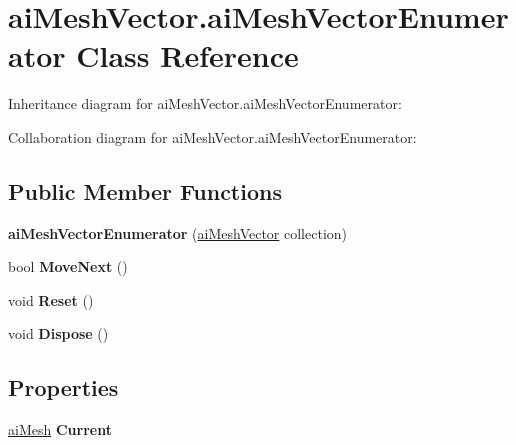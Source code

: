 \hypertarget{classai_mesh_vector_1_1ai_mesh_vector_enumerator}{\section{ai\+Mesh\+Vector.\+ai\+Mesh\+Vector\+Enumerator Class Reference}
\label{classai_mesh_vector_1_1ai_mesh_vector_enumerator}
}


Inheritance diagram for ai\+Mesh\+Vector.\+ai\+Mesh\+Vector\+Enumerator\+:


Collaboration diagram for ai\+Mesh\+Vector.\+ai\+Mesh\+Vector\+Enumerator\+:
\subsection*{Public Member Functions}
\begin{DoxyCompactItemize}
\item 
\hypertarget{classai_mesh_vector_1_1ai_mesh_vector_enumerator_a3e301f1f3a2a3c850f1acb9eba074722}{{\bfseries ai\+Mesh\+Vector\+Enumerator} (\hyperlink{classai_mesh_vector}{ai\+Mesh\+Vector} collection)}\label{classai_mesh_vector_1_1ai_mesh_vector_enumerator_a3e301f1f3a2a3c850f1acb9eba074722}

\item 
\hypertarget{classai_mesh_vector_1_1ai_mesh_vector_enumerator_a19d15e09e9916b11abbd9cb79c90ebeb}{bool {\bfseries Move\+Next} ()}\label{classai_mesh_vector_1_1ai_mesh_vector_enumerator_a19d15e09e9916b11abbd9cb79c90ebeb}

\item 
\hypertarget{classai_mesh_vector_1_1ai_mesh_vector_enumerator_acab5186890ca771ba334ed81fa95e9a9}{void {\bfseries Reset} ()}\label{classai_mesh_vector_1_1ai_mesh_vector_enumerator_acab5186890ca771ba334ed81fa95e9a9}

\item 
\hypertarget{classai_mesh_vector_1_1ai_mesh_vector_enumerator_ad0381823fb71fa1a13259a3c620c84ca}{void {\bfseries Dispose} ()}\label{classai_mesh_vector_1_1ai_mesh_vector_enumerator_ad0381823fb71fa1a13259a3c620c84ca}

\end{DoxyCompactItemize}
\subsection*{Properties}
\begin{DoxyCompactItemize}
\item 
\hypertarget{classai_mesh_vector_1_1ai_mesh_vector_enumerator_ac93239118d01f1e8dcda88b24ddabb7c}{\hyperlink{structai_mesh}{ai\+Mesh} {\bfseries Current}}\label{classai_mesh_vector_1_1ai_mesh_vector_enumerator_ac93239118d01f1e8dcda88b24ddabb7c}

\end{DoxyCompactItemize}


